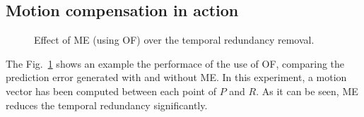 \subsection{Motion compensation in action}
\begin{figure}
  \caption{Effect of ME (using OF) over the temporal redundancy
    removal.}
  \label{fig:MC}
\end{figure}
The Fig.~\ref{fig:MC} shows an example the performace of the use of
OF, comparing the prediction error generated with and without ME. In
this experiment, a motion vector has been computed between each point
of $P$ and $R$. As it can be seen, ME reduces the temporal redundancy
significantly.

\begin{comment}
The OF~\cite{horn1981determining} tries to establish connections between the pixels of
the frames $P$ and $R$ supposing that:
\begin{enumerate}
\item $P$ and $R$ are adjacent in time (if $R$ was taken at time $t$,
  $P$ is taken at time $dt+t$) and therefore, similar in
  content.
\item Similarity between images implies that the pixels in both
  frames, $R$ and $P$, will have the same luminance. If $I(x,y,t)$
  measures the luminance of the pixel $(x,y)$ of the frame $R$,
  similarity can be modeled by
  \begin{equation}
    I(x+dx, y+dy, t+dt) = I(x,y,t),
    \label{eq:similarity}
  \end{equation}
  where $I(x+dx, y+dy, t+dt)$ is the corresponding pixel in the frame
  $P$. The first part of the Eq.~\ref{eq:similarity} can be also
  computed by (using the first-order Taylor expansion) as
  \begin{equation}
    I(x+dx, y+dy, t+dt) = I(x,y,t) + \frac{\partial I}{\partial x}dx + \frac{\partial I}{\partial y}dy + \frac{\partial I}{\partial t}dt,
    \label{eq:taylor_exp}
  \end{equation}
  andtherefore, it must be true that
  \begin{equation}
    \frac{\partial I}{\partial x}dx + \frac{\partial I}{\partial y}dy + \frac{\partial I}{\partial t}dt = 0.
    \label{eq:constraint}
  \end{equation}
  Dividing by $dt$, we finally get that
  \begin{equation}
    \frac{\partial I}{\partial x}\frac{dx}{dt} + \frac{\partial I}{\partial y}\frac{dy}{dt} + \frac{\partial I}{\partial t} = 0.
  \end{equation}
\item Adjacent pixels follow parallel
  trajectories~\cite{horn1981determining}, with basically means that
  neighbor pixels will have similar motion.
\end{enumerate}
\end{comment}


